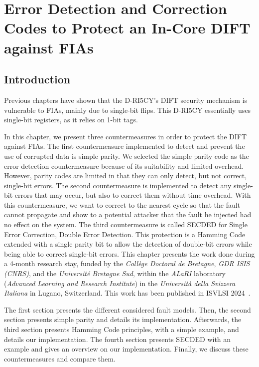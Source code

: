 \chapter{Error Detection and Correction Codes to Protect an In-Core DIFT against FIAs}
\label{chapter:countermeasures}
\minitoc

\section{Introduction}
Previous chapters have shown that the D-RI5CY's DIFT security mechanism is vulnerable to FIAs, mainly due to single-bit flips. This D-RI5CY essentially uses single-bit registers, as it relies on 1-bit tags.

In this chapter, we present three countermeasures in order to protect the DIFT against FIAs.
The first countermeasure implemented to detect and prevent the use of corrupted data is simple parity. We selected the simple parity code as the error detection countermeasure because of its suitability and limited overhead. However, parity codes are limited in that they can only detect, but not correct, single-bit errors.
The second countermeasure is implemented to detect any single-bit errors that may occur, but also to correct them without time overhead. With this countermeasure, we want to correct to the nearest cycle so that the fault cannot propagate and show to a potential attacker that the fault he injected had no effect on the system.
The third countermeasure is called SECDED for Single Error Correction, Double Error Detection. This protection is a Hamming Code extended with a single parity bit to allow the detection of double-bit errors while being able to correct single-bit errors.
This chapter presents the work done during a 4-month research stay, funded by the \textit{Collège Doctoral de Bretagne}, \textit{GDR ISIS (CNRS)}, and the \textit{Université Bretagne Sud}, within the \textit{ALaRI} laboratory (\textit{Advanced Learning and Research Institute}) in the \textit{Università della Svizzera Italiana} in Lugano, Switzerland.
This work has been published in ISVLSI 2024~\cite{PRLG-24-isvlsi}.

The first section presents the different considered fault models. Then, the second section presents simple parity and details its implementation. Afterwards, the third section presents Hamming Code principles, with a simple example, and details our implementation. The fourth section presents SECDED with an example and gives an overview on our implementation. Finally, we discuss these countermeasures and compare them.

